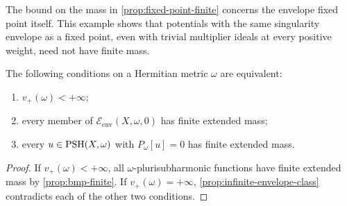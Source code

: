 The bound on the mass in \cref{prop:fixed-point-finite} concerns the envelope fixed point itself. This example shows that potentials with the same singularity envelope as a fixed point, even with trivial multiplier ideals at every positive weight, need not have finite mass.

\begin{corollary}\label{cor:bmp-relative-finiteness}
The following conditions on a Hermitian metric $\omega$ are equivalent:
\begin{enumerate}
\item $v_+(\omega)<+\infty$;
\item every member of $\mathcal E_{\mathrm{env}}(X,\omega,0)$ has finite extended mass;
\item every $u\in\mathrm{PSH}(X,\omega)$ with $P_\omega[u]=0$ has finite extended mass.
\end{enumerate}
\end{corollary}
\begin{proof}
If $v_+(\omega)<+\infty$, all $\omega$-plurisubharmonic functions have finite extended mass by \cref{prop:bmp-finite}. If $v_+(\omega)=+\infty$, \cref{prop:infinite-envelope-class} contradicts each of the other two conditions.
\end{proof}
